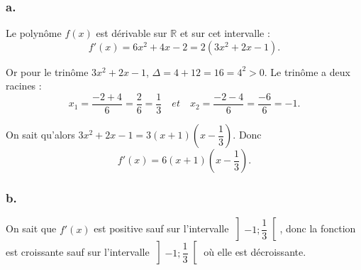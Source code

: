 	\subsubsection*{a.}
	
	Le polynôme \(f(x)\) est dérivable sur \(\mathbb{R}\) et sur cet intervalle :
	\[
	f'(x) = 6x^2 + 4x - 2 = 2(3x^2 + 2x - 1).
	\]
	
	Or pour le trinôme \(3x^2 + 2x - 1\), \(\Delta = 4 + 12 = 16 = 4^2 > 0\). Le trinôme a deux racines :
	\[
	x_1 = \dfrac{-2 + 4}{6} = \dfrac{2}{6} = \dfrac{1}{3} \quad et \quad x_2 = \dfrac{-2 - 4}{6} = \dfrac{-6}{6} = -1.
	\]
	
	On sait qu’alors \(3x^2 + 2x - 1 = 3(x + 1)(x - \dfrac{1}{3})\). Donc
	\[
	f'(x) = 6(x + 1)(x - \dfrac{1}{3}).
	\]
	
	\subsubsection*{b.}
	
	On sait que \(f'(x)\) est positive sauf sur l’intervalle \(\left] -1 ; \dfrac{1}{3} \right[\), donc la fonction est croissante sauf sur l’intervalle \(\left] -1 ; \dfrac{1}{3} \right[\) où elle est décroissante.
